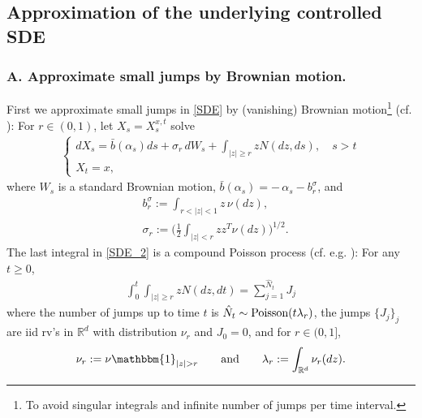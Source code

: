 \documentclass[a4paper,  twoside, 10pt, leqno]{amsart}
\newcommand{\N}{\mathbb{N}}
\newcommand{\R}{\mathbb{R}}
\newcommand{\rd}{\mathbb{R}^d}
\theoremstyle{remark}
\theoremstyle{definition}
\begin{document}
\subsection{Approximation of the underlying controlled SDE} \label{subsec:SDE}
\subsubsection*{A. Approximate small jumps by Brownian motion.}
First we approximate small jumps in \eqref{SDE} by (vanishing) Brownian
 motion\footnote{To avoid singular integrals and infinite number of
   jumps per time interval.} (cf. \cite{MR1834755}): For $r\in(0,1)$, let $X_s=X_s^{x,t}$ solve
\begin{align}
    \begin{cases}
    dX_s = \bar{b} (\alpha_s ) ds + \sigma_r \, dW_s + \int_{|z| \geq r} z N (dz,ds), \quad s>t\\
    X_t = x, 
    \end{cases}
    \label{SDE_2}
\end{align}
where $W_s$ is a standard Brownian motion, $\bar{b} ( \alpha_s) = -\,\alpha_s  - b_{r}^{\sigma}$, and 
\begin{align} \label{B_r}
&b_r^{\sigma} := \int_{r <|z| < 1} z\, \nu (dz), \\
&\sigma_r := \bigg( \frac{1}{2}  \int_{|z|<r} zz^T \nu (dz) \bigg)^{1/2} \label{sigma_r}.
\end{align}
 The last integral in \eqref{SDE_2} is a compound Poisson process (cf. e.g. \cite{applebaum2009levy}): For any $t\geq0$,
\begin{align}\label{copo}
  \int_0^{t}\int_{|z| \geq r} z N (dz,dt) = \sum_{j=1}^{\hat N_t}
J_j%
\end{align}
where the number of jumps up to time $t$ is $\hat N_t \sim
\textup{Poisson}(t\lambda_r)$, the jumps
$\{J_j\}_{j}$ are iid rv's in $\R^d$ with distribution $\nu_r$
and $J_0=0$, and for $r\in (0,1]$,
\begin{align}    \label{lambda_r}
    \nu_r := \nu \mathbbm{1}_{|z|>r} \qquad\text{and}\qquad \lambda_r := \int_{\rd} \nu_r(dz).
\end{align}
\end{document}
